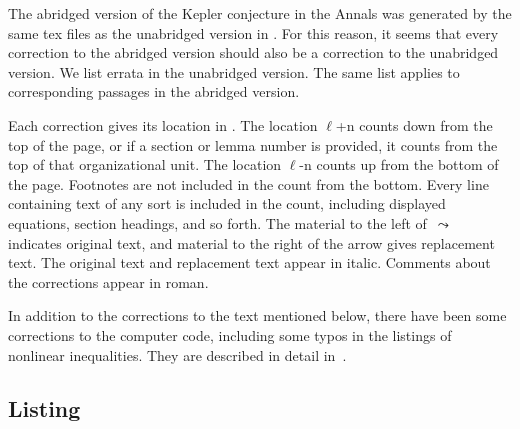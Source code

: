 \documentclass[11pt]{amsart}
\def\lto{\ensuremath{\,\leadsto\,}}
\def\line{$\ell$}
\begin{document}
The abridged version of the Kepler conjecture
in the Annals \cite{Hales:2005:Annals}
was generated by the same tex
files as the unabridged version in \cite{Hales:2006:DCG}.
For this reason,
it seems that every correction to
the abridged version should also be a correction to the unabridged version.
We list errata in the
unabridged version. The same list applies to corresponding 
passages in the abridged version.  



Each correction gives its location in \cite{Hales:2006:DCG}.
The location
\line+n counts down from the top of the page, or
if a section or lemma number is provided, it
counts from the top of that organizational unit.
The location \line-n counts up from the bottom
of the page. Footnotes are not included in the
count from the bottom.  Every line containing
text of any sort is included in the count,
including displayed equations, section headings,
and so forth.  The material to the left of $\lto$ 
indicates original text, and material to the right of the
arrow gives replacement text.  
The original text and replacement text appear in italic.
Comments about the corrections appear in roman. 


In addition to the corrections to the text mentioned below, 
there have been some corrections to the computer code, including some typos in the
listings of nonlinear inequalities.
They are described in detail in~\cite{Hales:2008:Errata}.


\subsection{Listing}\hfill\break
{}\baselineskip
\end{document}
